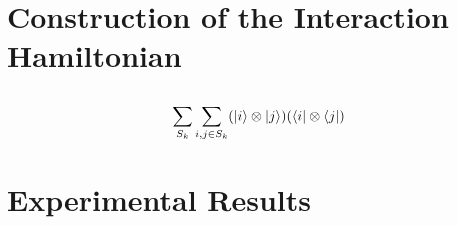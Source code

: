 \documentclass[a4paper,english]{article}
\begin{document}

\section{Construction of the Interaction Hamiltonian}

\subsection{}
%
%
%

$$ \sum_{S_k} \sum_{i,j \in S_k} (\ket{i} \otimes \ket{j})(\bra{i} \otimes \bra{j})  $$
\subsection{}
\subsection{}


\section{Experimental Results}
\end{document}
